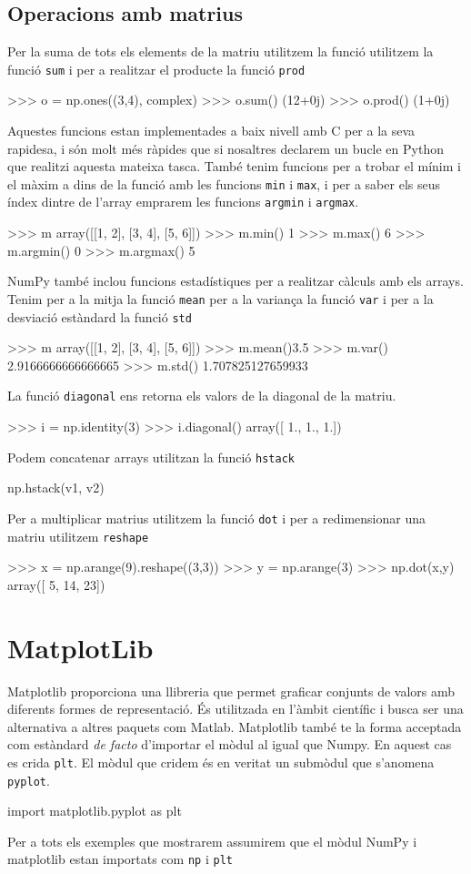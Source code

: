 \subsection{Operacions amb matrius}
Per la suma de tots els elements de la matriu utilitzem la funció utilitzem la funció {\tt sum} i per a realitzar el producte la funció {\tt prod}
\begin{blockcode}
>>> o = np.ones((3,4), complex)
>>> o.sum()
(12+0j)
>>> o.prod()
(1+0j)
\end{blockcode}
Aquestes funcions estan implementades a baix nivell amb C per a la seva rapidesa, i són molt més ràpides que si nosaltres declarem un bucle en Python que realitzi aquesta mateixa tasca.
També tenim funcions per a trobar el mínim i el màxim a dins de la funció amb les funcions {\tt min} i {\tt max}, i per a saber els seus índex dintre de l'array emprarem les funcions {\tt argmin} i {\tt argmax}.
\begin{blockcode}
>>> m
array([[1, 2],
       [3, 4],
       [5, 6]])
>>> m.min()
1
>>> m.max()
6
>>> m.argmin()
0
>>> m.argmax()
5
\end{blockcode}
NumPy també inclou funcions estadístiques per a realitzar càlculs amb els arrays. Tenim per a la mitja la funció {\tt mean} per a la variança la funció {\tt var} i per a la desviació estàndard la funció {\tt std}
\begin{blockcode}
>>> m
array([[1, 2],
       [3, 4],
       [5, 6]])
>>> m.mean()3.5
>>> m.var()
2.9166666666666665
>>> m.std()
1.707825127659933
\end{blockcode}
La funció {\tt diagonal} ens retorna els valors de la diagonal de la matriu.
\begin{blockcode}
>>> i = np.identity(3)
>>> i.diagonal()
array([ 1.,  1.,  1.])
\end{blockcode}
Podem concatenar arrays utilitzan la funció {\tt hstack}
\begin{blockcode}
np.hstack(v1, v2)
\end{blockcode}
Per a multiplicar matrius utilitzem la funció {\tt dot} i per a redimensionar una matriu utilitzem {\tt reshape}
\begin{blockcode}
>>> x = np.arange(9).reshape((3,3))
>>> y = np.arange(3)
>>> np.dot(x,y)
array([ 5, 14, 23])
\end{blockcode}
\section{MatplotLib}
Matplotlib proporciona una llibreria que permet graficar conjunts de valors amb diferents formes de representació. És utilitzada en l'àmbit científic i busca ser una alternativa a altres paquets com Matlab. Matplotlib també te la forma acceptada com estàndard \emph{de facto} d'importar el mòdul al igual que Numpy. En aquest cas es crida {\tt plt}. El mòdul que cridem és en veritat un submòdul que s'anomena {\tt pyplot}.
\begin{blockcode}
import matplotlib.pyplot as plt
\end{blockcode}
Per a tots els exemples que mostrarem assumirem que el mòdul NumPy i matplotlib estan importats com {\tt np} i {\tt plt}
